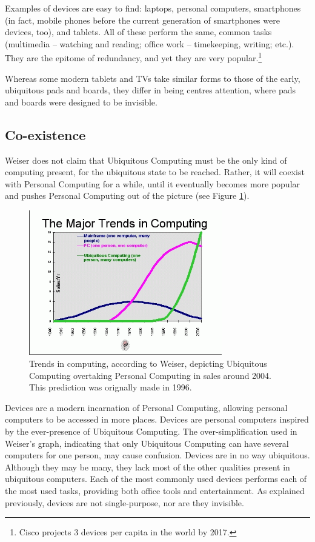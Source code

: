 Examples of devices are easy to find: laptops, personal computers, smartphones (in fact, mobile phones before the current generation
of smartphones were devices, too), and tablets. All of these perform the same, common
tasks (multimedia -- watching and reading; office work -- timekeeping, writing; etc.). They are the epitome of redundancy, and yet
they are very popular.\footnote{Cisco projects 3 devices per capita in the world by 2017.\cite{cisco}}

Whereas some modern tablets and TVs take similar forms to those of the early, ubiquitous pads and boards, they differ in being
centres attention, where pads and boards were designed to be invisible.

\subsection*{Co-existence}

Weiser does not claim that Ubiquitous Computing must be the only kind of computing present, for the ubiquitous state to be reached.
Rather, it will coexist with Personal Computing for a while, until it eventually becomes more popular and pushes Personal Computing
out of the picture (see Figure \ref{fig:trends-graph}).

\begin{figure}[htb]
	\centering
	\includegraphics[width=0.75\textwidth]{multipurpose/trends-graph}
	\caption{Trends in computing, according to Weiser, depicting Ubiquitous Computing overtaking Personal Computing in sales around
		2004. This prediction was orignally made in 1996.\cite{weisernomadic}}
	\label{fig:trends-graph}
\end{figure}

Devices are a modern incarnation of Personal Computing, allowing personal computers to be accessed in more places. Devices are personal
computers inspired by the ever-presence of Ubiquitous Computing. The over-simplification used in Weiser's graph, indicating that only
Ubiquitous Computing can have several computers for one person, may cause confusion. Devices are in no way ubiquitous. Although they may
be many, they lack most of the other qualities present in ubiquitous computers. Each
of the most commonly used devices performs each of the most used tasks, providing both office tools and entertainment. As explained
previously, devices are not single-purpose, nor are they invisible.

